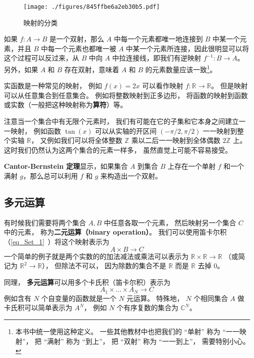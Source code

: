 \begin{figure}[ht]
\centering
\texttt{[image: ./figures/845ffbe6a2eb30b5.pdf]}
\caption{映射的分类} \label{fig_map_1}
\end{figure}

如果 $f: A \to B$ 是一个双射，那么 $A$ 中每一个元素都唯一地连接到 $B$ 中某一个元素，并且 $B$ 中每一个元素也都唯一被 $A$ 中某一个元素所连接，因此很明显可以将这个过程可以反过来，从 $B$ 中向 $A$ 中拉连接线，即我们有逆映射 $f^{-1}: B \to A$。另外，如果 $A$ 和 $B$ 存在双射，意味着 $A$ 和 $B$ 的元素数量应该一致\footnote{本书中统一使用这种定义。 一些其他教材中也把我们的 “单射” 称为 “一一映射”， 把 “满射” 称为 “到上”， 把 “双射” 称为 “一一到上”， 需要特别小心。}。

实函数是一种常见的映射， 例如 $f(x) = 2x$ 可以看作映射 $f: \mathbb R \to \mathbb R$。 但是映射可以从任意集合到任意集合。 例如将整数映射到正多边形， 将函数的映射到函数或实数（一般把这种映射称为\textbf{算符}）等。

注意当一个集合中有无限个元素时， 我们有可能在它的子集和它本身之间建立一一映射， 例如函数 $\tan(x)$ 可以从实轴的开区间 $(-\pi/2, \pi/2)$ 一一映射到整个实轴 $\mathbb R$， 又例如我们可以将全体整数 $\mathbb Z$ 乘以二后一一映射到全体偶数 $2\mathbb Z$ 上。 这时我们仍然认为这两个集合的元素一样多， 虽然直觉上可能不容易接受。

\textbf{Cantor-Bernstein 定理}显示，如果集合 $A$ 到集合 $B$ 上存在一个单射 $f$ 和一个满射 $g$，那么总可以利用 $f$ 和 $g$ 来构造出一个双射。

\subsection{多元运算}\label{sub_map_1}
有时候我们需要将两个集合 $A, B$ 中任意各取一个元素， 然后映射另一个集合 $C$ 中的元素， 称为\textbf{二元运算（binary operation）}。 我们可以使用笛卡尔积（\autoref{eq_Set_1}~）将这个映射表示为
\begin{equation}\label{eq_map_1}
A \times B \to C
\end{equation}
一个简单的例子就是两个实数的的加法减法或乘法可以表示为 $\mathbb R \times \mathbb R \to \mathbb R$ （或简记为 $\mathbb R^2 \to \mathbb R$）， 但除法不可以， 因为除数的集合不是 $\mathbb R$ 而是 $\mathbb R$ 去掉 $0$。


同理， \textbf{多元运算}可以用多个卡氏积（笛卡尔积）表示为
\begin{equation}
A_1 \times \dots \times A_N \to C
\end{equation}
例如含有 $N$ 个自变量的函数就是一个 $N$ 元运算。 特殊地， $N$ 个相同集合 $A$ 做卡氏积可以简单表示为 $A^N$， 例如 $N$ 个有序复数的集合为 $\mathbb C^N$。

